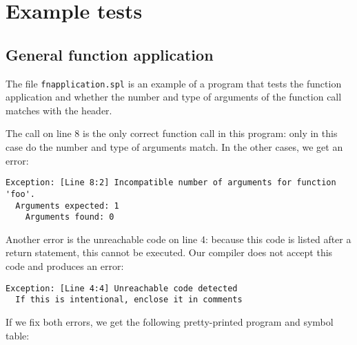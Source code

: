 \documentclass[a4paper]{article}
\begin{document}
\section{Example tests}
\label{examples}

\subsection{General function application}
The file {\tt fnapplication.spl} is an example of a program that tests the function application and whether the number and type of arguments of the function call matches with the header.

The call on line 8 is the only correct function call in this program: only in this case do the number and type of arguments match. In the other cases, we get an error: 
\begin{verbatim}
Exception: [Line 8:2] Incompatible number of arguments for function 'foo'.
  Arguments expected: 1
    Arguments found: 0
\end{verbatim}
Another error is the unreachable code on line 4: because this code is listed after a return statement, this cannot be executed. Our compiler does not accept this code and produces an error: 
\begin{verbatim}
Exception: [Line 4:4] Unreachable code detected
  If this is intentional, enclose it in comments
\end{verbatim}
If we fix both errors, we get the following pretty-printed program and symbol table: 
\end{document}
